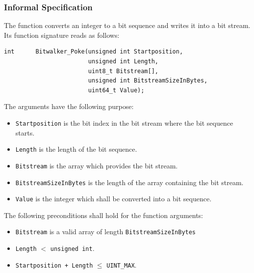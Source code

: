 \subsubsection{Informal Specification}
\label{informal-poke}

The function \poke converts an integer to a bit sequence and writes it
into a bit stream.
Its function signature reads as follows:
\begin{lstlisting}[style = acsl-block]
int      Bitwalker_Poke(unsigned int Startposition,
                        unsigned int Length,
                        uint8_t Bitstream[],
                        unsigned int BitstreamSizeInBytes,
                        uint64_t Value);
\end{lstlisting}


The arguments have the following purpose:

\begin{itemize}
    \item \texttt{Startposition} is the bit index in the bit stream 
    where the bit sequence starts.
    \item \texttt{Length} is the length of the bit sequence.
    \item \texttt{Bitstream} is the array which provides the bit stream.
    \item \texttt{BitstreamSizeInBytes} is the length of the array 
    containing the bit stream. 
    \item \texttt{Value} is the integer which shall be converted into a bit sequence.
\end{itemize}


The following preconditions shall hold for the function arguments:

\begin{itemize}
\item \texttt{Bitstream} is a valid array of length \verb"BitstreamSizeInBytes"

\item \texttt{Length} $<$ \texttt{unsigned int}.

\item \texttt{Startposition + Length} $\leq$ \verb"UINT_MAX".
\end{itemize}

